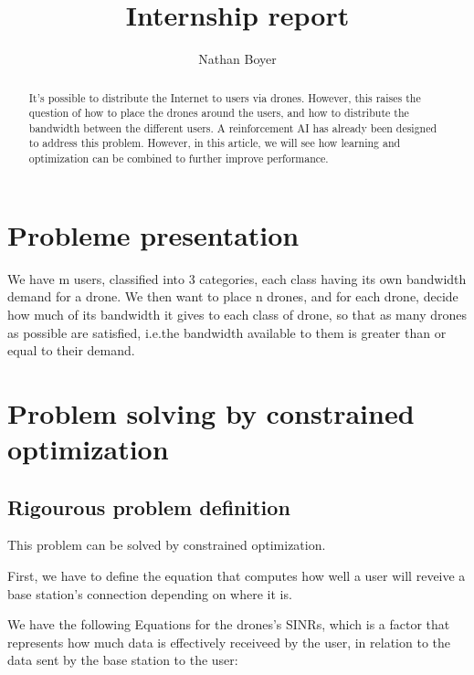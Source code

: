 \documentclass[letterpaper]{article}
\title{Internship report}
\author{Nathan Boyer}
\begin{document}
\maketitle


\begin{multicols}{2}
    


\begin{abstract}
    
    It's possible to distribute the Internet to users via drones.
    However, this raises the question of how to place the drones around the users, and how to distribute the bandwidth between the different users.
    A reinforcement AI has already been designed to address this problem.
    However, in this article, we will see how learning and optimization can be combined to further improve performance.

\end{abstract}


\section{Probleme presentation}

We have m users, classified into 3 categories, each class having its own bandwidth demand for a drone.
We then want to place n drones, and for each drone, decide how much of its bandwidth it gives to each class of drone, so that as many drones as possible are satisfied, i.e.\:the bandwidth available to them is greater than or equal to their demand.

\section{Problem solving by constrained optimization}

\subsection{Rigourous problem definition}

This problem can be solved by constrained optimization.

First, we have to define the equation that computes how well a user will reveive a base station's connection depending on where it is.

We have the following Equations for the drones's SINRs, which is a factor that represents how much data is effectively receiveed by the user, in relation to the data sent by the base station to the user:


\end{multicols}
\end{document}
